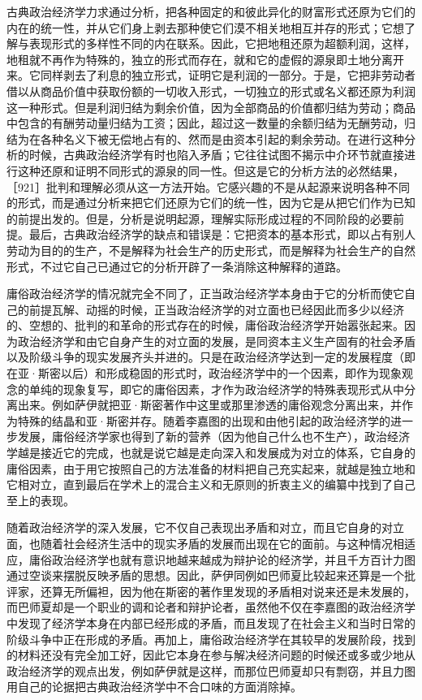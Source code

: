 古典政治经济学力求通过分析，把各种固定的和彼此异化的财富形式还原为它们的内在的统一性，并从它们身上剥去那种使它们漠不相关地相互并存的形式；它想了解与表现形式的多样性不同的内在联系。因此，它把地租还原为超额利润，这样，地租就不再作为特殊的，独立的形式而存在，就和它的虚假的源泉即土地分离开来。它同样剥去了利息的独立形式，证明它是利润的一部分。于是，它把非劳动者借以从商品价值中获取份额的一切收入形式，一切独立的形式或名义都还原为利润这一种形式。但是利润归结为剩余价值，因为全部商品的价值都归结为劳动；商品中包含的有酬劳动量归结为工资；因此，超过这一数量的余额归结为无酬劳动，归结为在各种名义下被无偿地占有的、然而是由资本引起的剩余劳动。在进行这种分析的时候，古典政治经济学有时也陷入矛盾；它往往试图不揭示中介环节就直接进行这种还原和证明不同形式的源泉的同一性。但这是它的分析方法的必然结果，［921］批判和理解必须从这一方法开始。它感兴趣的不是从起源来说明各种不同的形式，而是通过分析来把它们还原为它们的统一性，因为它是从把它们作为已知的前提出发的。但是，分析是说明起源，理解实际形成过程的不同阶段的必要前提。最后，古典政治经济学的缺点和错误是：它把资本的基本形式，即以占有别人劳动为目的的生产，不是解释为社会生产的历史形式，而是解释为社会生产的自然形式，不过它自己已通过它的分析开辟了一条消除这种解释的道路。

庸俗政治经济学的情况就完全不同了，正当政治经济学本身由于它的分析而使它自己的前提瓦解、动摇的时候，正当政治经济学的对立面也已经因此而多少以经济的、空想的、批判的和革命的形式存在的时候，庸俗政治经济学开始嚣张起来。因为政治经济学和由它自身产生的对立面的发展，是同资本主义生产固有的社会矛盾以及阶级斗争的现实发展齐头并进的。只是在政治经济学达到一定的发展程度（即在亚·斯密以后）和形成稳固的形式时，政治经济学中的一个因素，即作为现象观念的单纯的现象复写，即它的庸俗因素，才作为政治经济学的特殊表现形式从中分离出来。例如萨伊就把亚·斯密著作中这里或那里渗透的庸俗观念分离出来，并作为特殊的结晶和亚·斯密并存。随着李嘉图的出现和由他引起的政治经济学的进一步发展，庸俗经济学家也得到了新的营养（因为他自己什么也不生产），政治经济学越是接近它的完成，也就是说它越是走向深入和发展成为对立的体系，它自身的庸俗因素，由于用它按照自己的方法准备的材料把自己充实起来，就越是独立地和它相对立，直到最后在学术上的混合主义和无原则的折衷主义的编纂中找到了自己至上的表现。

随着政治经济学的深入发展，它不仅自己表现出矛盾和对立，而且它自身的对立面，也随着社会经济生活中的现实矛盾的发展而出现在它的面前。与这种情况相适应，庸俗政治经济学也就有意识地越来越成为辩护论的经济学，并且千方百计力图通过空谈来摆脱反映矛盾的思想。因此，萨伊同例如巴师夏比较起来还算是一个批评家，还算无所偏袒，因为他在斯密的著作里发现的矛盾相对说来还是未发展的，而巴师夏却是一个职业的调和论者和辩护论者，虽然他不仅在李嘉图的政治经济学中发现了经济学本身在内部已经形成的矛盾，而且发现了在社会主义和当时日常的阶级斗争中正在形成的矛盾。再加上，庸俗政治经济学在其较早的发展阶段，找到的材料还没有完全加工好，因此它本身在参与解决经济问题的时候还或多或少地从政治经济学的观点出发，例如萨伊就是这样，而那位巴师夏却只有剽窃，并且力图用自己的论据把古典政治经济学中不合口味的方面消除掉。

